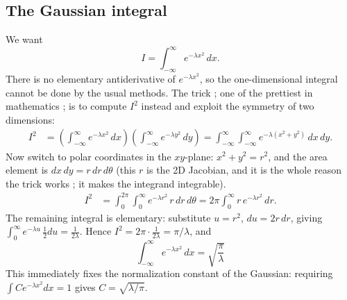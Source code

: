 \documentclass{report}
\numberwithin{equation}{section}
\begin{document}
\subsection{The Gaussian integral}
We want
\begin{equation}
	I = \int_{-\infty}^{\infty} e^{-\lambda x^2}\,dx.
\end{equation}
There is no elementary antiderivative of $e^{-\lambda x^2}$, so the one-dimensional integral cannot be done by the usual methods. The trick ; one of the prettiest in mathematics ; is to compute $I^2$ instead and exploit the symmetry of two dimensions:
\begin{align*}
	I^2 &= \left(\int_{-\infty}^{\infty} e^{-\lambda x^2}\,dx\right)\left(\int_{-\infty}^{\infty} e^{-\lambda y^2}\,dy\right)
	= \int_{-\infty}^{\infty}\!\!\int_{-\infty}^{\infty} e^{-\lambda(x^2+y^2)}\,dx\,dy.
\end{align*}
Now switch to polar coordinates in the $xy$-plane: $x^2+y^2 = r^2$, and the area element is $dx\,dy = r\,dr\,d\theta$ (this $r$ is the 2D Jacobian, and it is the whole reason the trick works ; it makes the integrand integrable).
\begin{align*}
	I^2 &= \int_0^{2\pi}\!\!\int_0^{\infty} e^{-\lambda r^2}\,r\,dr\,d\theta
	= 2\pi\int_0^{\infty} r\,e^{-\lambda r^2}\,dr.
\end{align*}
The remaining integral is elementary: substitute $u = r^2$, $du = 2r\,dr$, giving $\int_0^\infty e^{-\lambda u}\,\tfrac12 du = \tfrac{1}{2\lambda}$. Hence $I^2 = 2\pi\cdot\tfrac{1}{2\lambda} = \pi/\lambda$, and
\begin{equation}
	\boxed{\;\int_{-\infty}^{\infty} e^{-\lambda x^2}\,dx = \sqrt{\frac{\pi}{\lambda}}\;}
\end{equation}
This immediately fixes the normalization constant of the Gaussian: requiring $\int C e^{-\lambda x^2}dx = 1$ gives $C = \sqrt{\lambda/\pi}$.
\end{document}
